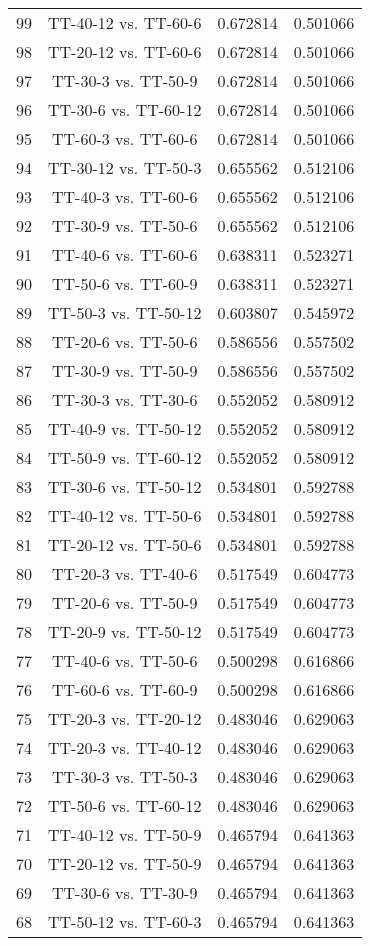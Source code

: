 \documentclass[a4paper,10pt]{article}
\begin{document}
\begin{landscape}
\begin{table}[!htp]
\begin{tabular}{cccc}
99&TT-40-12 vs. TT-60-6&0.672814&0.501066\\
98&TT-20-12 vs. TT-60-6&0.672814&0.501066\\
97&TT-30-3 vs. TT-50-9&0.672814&0.501066\\
96&TT-30-6 vs. TT-60-12&0.672814&0.501066\\
95&TT-60-3 vs. TT-60-6&0.672814&0.501066\\
94&TT-30-12 vs. TT-50-3&0.655562&0.512106\\
93&TT-40-3 vs. TT-60-6&0.655562&0.512106\\
92&TT-30-9 vs. TT-50-6&0.655562&0.512106\\
91&TT-40-6 vs. TT-60-6&0.638311&0.523271\\
90&TT-50-6 vs. TT-60-9&0.638311&0.523271\\
89&TT-50-3 vs. TT-50-12&0.603807&0.545972\\
88&TT-20-6 vs. TT-50-6&0.586556&0.557502\\
87&TT-30-9 vs. TT-50-9&0.586556&0.557502\\
86&TT-30-3 vs. TT-30-6&0.552052&0.580912\\
85&TT-40-9 vs. TT-50-12&0.552052&0.580912\\
84&TT-50-9 vs. TT-60-12&0.552052&0.580912\\
83&TT-30-6 vs. TT-50-12&0.534801&0.592788\\
82&TT-40-12 vs. TT-50-6&0.534801&0.592788\\
81&TT-20-12 vs. TT-50-6&0.534801&0.592788\\
80&TT-20-3 vs. TT-40-6&0.517549&0.604773\\
79&TT-20-6 vs. TT-50-9&0.517549&0.604773\\
78&TT-20-9 vs. TT-50-12&0.517549&0.604773\\
77&TT-40-6 vs. TT-50-6&0.500298&0.616866\\
76&TT-60-6 vs. TT-60-9&0.500298&0.616866\\
75&TT-20-3 vs. TT-20-12&0.483046&0.629063\\
74&TT-20-3 vs. TT-40-12&0.483046&0.629063\\
73&TT-30-3 vs. TT-50-3&0.483046&0.629063\\
72&TT-50-6 vs. TT-60-12&0.483046&0.629063\\
71&TT-40-12 vs. TT-50-9&0.465794&0.641363\\
70&TT-20-12 vs. TT-50-9&0.465794&0.641363\\
69&TT-30-6 vs. TT-30-9&0.465794&0.641363\\
68&TT-50-12 vs. TT-60-3&0.465794&0.641363\\

\end{tabular}
\end{table}
\end{landscape}
\end{document}
